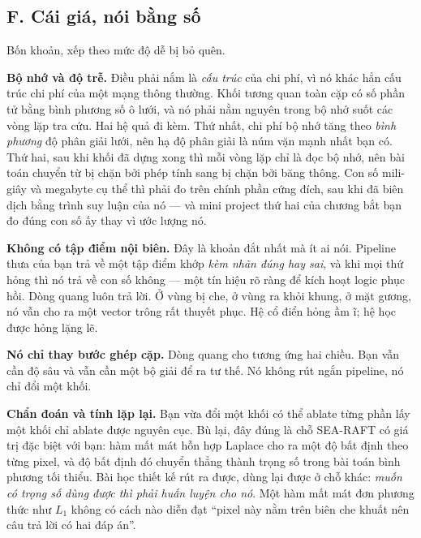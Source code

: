 \documentclass[../../deep_learning.tex]{subfiles}
\begin{document}
\subsection{F. Cái giá, nói bằng số}
Bốn khoản, xếp theo mức độ dễ bị bỏ quên.

\textbf{Bộ nhớ và độ trễ.} Điều phải nắm là \emph{cấu trúc} của chi phí, vì nó khác hẳn cấu trúc chi phí của một mạng thông thường. Khối tương quan toàn cặp có số phần tử bằng bình phương số ô lưới, và nó phải nằm nguyên trong bộ nhớ suốt các vòng lặp tra cứu. Hai hệ quả đi kèm. Thứ nhất, chi phí bộ nhớ tăng theo \emph{bình phương} độ phân giải lưới, nên hạ độ phân giải là núm vặn mạnh nhất bạn có. Thứ hai, sau khi khối đã dựng xong thì mỗi vòng lặp chỉ là đọc bộ nhớ, nên bài toán chuyển từ bị chặn bởi phép tính sang bị chặn bởi băng thông. Con số mili-giây và megabyte cụ thể thì phải đo trên chính phần cứng đích, sau khi đã biên dịch bằng trình suy luận của nó --- và mini project thứ hai của chương bắt bạn đo đúng con số ấy thay vì ước lượng nó.

\textbf{Không có tập điểm nội biên.} Đây là khoản đắt nhất mà ít ai nói. Pipeline thưa của bạn trả về một tập điểm khớp \emph{kèm nhãn đúng hay sai}, và khi mọi thứ hỏng thì nó trả về con số không --- một tín hiệu rõ ràng để kích hoạt logic phục hồi. Dòng quang luôn trả lời. Ở vùng bị che, ở vùng ra khỏi khung, ở mặt gương, nó vẫn cho ra một vector trông rất thuyết phục. Hệ cổ điển hỏng ầm ĩ; hệ học được hỏng lặng lẽ.

\textbf{Nó chỉ thay bước ghép cặp.} Dòng quang cho tương ứng hai chiều. Bạn vẫn cần độ sâu và vẫn cần một bộ giải để ra tư thế. Nó không rút ngắn pipeline, nó chỉ đổi một khối.

\textbf{Chẩn đoán và tính lặp lại.} Bạn vừa đổi một khối có thể ablate từng phần lấy một khối chỉ ablate được nguyên cục. Bù lại, đây đúng là chỗ SEA-RAFT có giá trị đặc biệt với bạn: hàm mất mát hỗn hợp Laplace cho ra một độ bất định theo từng pixel, và độ bất định đó chuyển thẳng thành trọng số trong bài toán bình phương tối thiểu. Bài học thiết kế rút ra được, dùng lại được ở chỗ khác: \emph{muốn có trọng số dùng được thì phải huấn luyện cho nó}. Một hàm mất mát đơn phương thức như \(L_1\) không có cách nào diễn đạt ``pixel này nằm trên biên che khuất nên câu trả lời có hai đáp án''.
\end{document}
